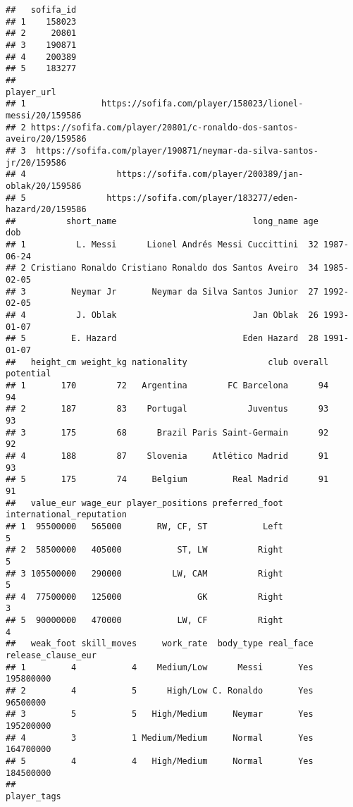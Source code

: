 \documentclass[
]{article}
\begin{document}
\begin{verbatim}
##   sofifa_id
## 1    158023
## 2     20801
## 3    190871
## 4    200389
## 5    183277
##                                                              player_url
## 1               https://sofifa.com/player/158023/lionel-messi/20/159586
## 2 https://sofifa.com/player/20801/c-ronaldo-dos-santos-aveiro/20/159586
## 3  https://sofifa.com/player/190871/neymar-da-silva-santos-jr/20/159586
## 4                  https://sofifa.com/player/200389/jan-oblak/20/159586
## 5                https://sofifa.com/player/183277/eden-hazard/20/159586
##          short_name                           long_name age        dob
## 1          L. Messi      Lionel Andrés Messi Cuccittini  32 1987-06-24
## 2 Cristiano Ronaldo Cristiano Ronaldo dos Santos Aveiro  34 1985-02-05
## 3         Neymar Jr       Neymar da Silva Santos Junior  27 1992-02-05
## 4          J. Oblak                           Jan Oblak  26 1993-01-07
## 5         E. Hazard                         Eden Hazard  28 1991-01-07
##   height_cm weight_kg nationality                club overall potential
## 1       170        72   Argentina        FC Barcelona      94        94
## 2       187        83    Portugal            Juventus      93        93
## 3       175        68      Brazil Paris Saint-Germain      92        92
## 4       188        87    Slovenia     Atlético Madrid      91        93
## 5       175        74     Belgium         Real Madrid      91        91
##   value_eur wage_eur player_positions preferred_foot international_reputation
## 1  95500000   565000       RW, CF, ST           Left                        5
## 2  58500000   405000           ST, LW          Right                        5
## 3 105500000   290000          LW, CAM          Right                        5
## 4  77500000   125000               GK          Right                        3
## 5  90000000   470000           LW, CF          Right                        4
##   weak_foot skill_moves     work_rate  body_type real_face release_clause_eur
## 1         4           4    Medium/Low      Messi       Yes          195800000
## 2         4           5      High/Low C. Ronaldo       Yes           96500000
## 3         5           5   High/Medium     Neymar       Yes          195200000
## 4         3           1 Medium/Medium     Normal       Yes          164700000
## 5         4           4   High/Medium     Normal       Yes          184500000
##                                                                                                                            player_tags

\end{verbatim}
\end{document}
